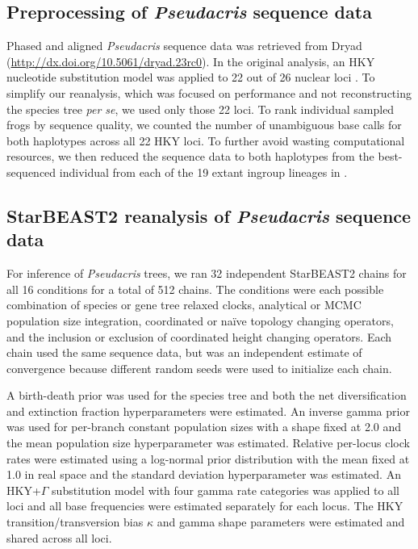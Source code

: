 \documentclass[nogrid]{MBE}%
\begin{document}
\subsection{Preprocessing of \textit{Pseudacris} sequence data}

Phased and aligned \textit{Pseudacris} sequence data was retrieved from Dryad
(\url{http://dx.doi.org/10.5061/dryad.23rc0}). In the original analysis, an HKY nucleotide substitution
model was applied to 22 out of 26 nuclear loci \citep{Barrow201478}. To simplify
our reanalysis, which was focused on performance and not reconstructing the
species tree \textit{per se}, we used only those 22 loci. To rank
individual sampled frogs by sequence quality, we counted the number of unambiguous base
calls for both haplotypes across all 22 HKY loci. To further avoid wasting
computational resources, we then reduced the sequence data to both haplotypes
from the best-sequenced individual from each of the 19 extant ingroup lineages
in \cite{Barrow201478}.

\subsection{StarBEAST2 reanalysis of \textit{Pseudacris} sequence data}

For inference of \textit{Pseudacris} trees, we ran 32 independent StarBEAST2
chains for all 16 conditions for a total of 512 chains. The conditions were each
possible combination of species or gene tree relaxed clocks, analytical or
MCMC population size integration, coordinated or na\"ive topology changing
operators, and the inclusion or exclusion of coordinated height changing
operators. Each chain used the same sequence data, but was an independent
estimate of convergence because different random seeds were used to initialize
each chain.

A birth-death prior was used for the species tree and both the net diversification
and extinction fraction hyperparameters were estimated. An inverse gamma prior was
used for per-branch constant population sizes with a shape fixed at 2.0 and the
mean population size hyperparameter was estimated. Relative per-locus clock
rates were estimated using a log-normal prior distribution with the mean fixed
at 1.0 in real space and the standard deviation hyperparameter was estimated. An
HKY+$\Gamma$ substitution model with four gamma rate categories was applied to
all loci and all base frequencies were estimated separately for each locus. The
HKY transition/transversion bias $\kappa$ and gamma shape parameters were estimated and shared across all loci.
\end{document}
